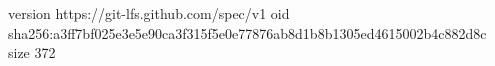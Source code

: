 version https://git-lfs.github.com/spec/v1
oid sha256:a3ff7bf025e3e5e90ca3f315f5e0e77876ab8d1b8b1305ed4615002b4c882d8c
size 372
